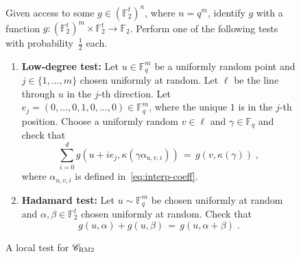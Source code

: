 \documentclass[11pt]{article}
\theoremstyle{definition}
\newcommand{\code}{\mathscr{C}}
\newcommand{\F}{\ensuremath{\mathbb{F}}}
\newcommand{\bRM}{\ensuremath{\textsc{RM2}}}
\newenvironment{gamespec}{
  \begin{mdframed}[style=figstyle]}{
  \end{mdframed}}
\begin{document}
\begin{figure}[!htbp]
  \centering
  \begin{gamespec}
Given access to some $g\in (\F_2^t)^n$, where $n=q^m$, identify $g$ with a function $g:(\F_2^t)^m \times \F_2^t \to \F_2$. Perform one of the following tests with probability~$\tfrac{1}{2}$ each. 
\begin{enumerate}
	\item \textbf{Low-degree test:}
		Let $u \in \F_q^m$ be a uniformly random point and $j\in \{1,\ldots,m\}$ chosen uniformly at random. Let $\ell$ be the line through $u$ in the $j$-th direction. Let $e_j=(0,\ldots,0,1,0,\ldots,0)\in \F_q^m$, where the unique $1$ is in the $j$-th position. Choose a uniformly random $v\in \ell$ and $\gamma\in \F_q$ and check that 
		\[\sum_{i=0}^d g(u+ie_j,\kappa(\gamma \alpha_{u,v,i})) \,=\, g(v,\kappa(\gamma))\;,\]
		where $\alpha_{u,v,i}$ is defined in~\eqref{eq:interp-coeff}.
	\item \textbf{Hadamard test:} Let $u\sim\F_q^m$ be chosen uniformly at random and $\alpha,\beta\in \F_2^t$ chosen uniformly at random. Check that 
	\[g(u,\alpha)+g(u,\beta)\,=\,g(u,\alpha+\beta)\;.\] 	
    \end{enumerate}
  \end{gamespec}
  \caption{A local test for $\code_{\bRM}$}
  \label{fig:bRM-tester}
\end{figure}
\end{document}
